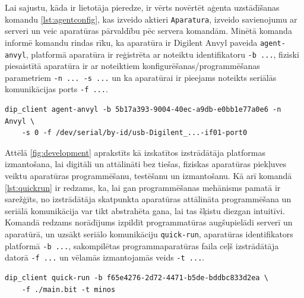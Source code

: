 Lai sajustu, kāda ir lietotāja pieredze, ir vērts novērtēt aģenta uzstādīšanas
komandu \ref{lst:agentconfig}, kas izveido aktieri \lstinline!Aparatura!,
izveido savienojumu ar serveri un veic aparatūras pārvaldību pēc servera
komandām. Minētā komanda informē komandu rindas rīku, ka aparatūra ir Digilent
Anvyl paveida \lstinline!agent-anvyl!, platformā aparatūra ir reģistrēta ar noteiktu
identifikatoru \lstinline!-b ...!, fiziski piesaistītā aparatūra ir ar noteiktiem
konfigurēšanas/programmēšanas parametriem \lstinline!-n ... -s ...! un ka aparatūrai ir
pieejams noteikts seriālās komunikācijas ports \lstinline!-f ...!.

\begin{lstlisting}[caption={Aģenta uzstādīšana komandu rindā},label={lst:agentconfig},captionpos=b]
dip_client agent-anvyl -b 5b17a393-9004-40ec-a9db-e0bb1e77a0e6 -n Anvyl \
    -s 0 -f /dev/serial/by-id/usb-Digilent_...-if01-port0
\end{lstlisting}

Attēlā \ref{fig:development} aprakstīts kā izskatītos izstrādātāja platformas
izmantošana, lai digitāli un attālināti bez tiešas, fiziskas aparatūras
piekļuves veiktu aparatūras programmēšanu, testēšanu un izmantošanu. Kā arī
komandā \ref{lst:quickrun} ir redzams, ka, lai gan programmēšanas mehānisms
pamatā ir sarežģīts, no izstrādātāja skatpunkta aparatūras attālināta
programmēšana un seriālā komunikācija var tikt abstrahēta gana, lai tas šķistu
diezgan intuitīvi. Komandā redzams norādījums izpildīt programmatūras
augšupielādi serverī un aparatūrā, un uzsākt seriālo komunikāciju
\lstinline!quick-run!, aparatūras identifikators platformā \lstinline!-b ...!,
sakompilētas programmaparatūras faila ceļš izstrādātāja datorā \lstinline!-f ...!
un vēlamās izmantojamās \glslink{vinterface}{virtuālās saskarnes} veids
\lstinline!-t ...!.

\begin{lstlisting}[caption={Programmaparatūras augšupielāde un seriālās komunikācijas klienta komanda},label={lst:quickrun},captionpos=b]
dip_client quick-run -b f65e4276-2d72-4471-b5de-bddbc833d2ea \ 
    -f ./main.bit -t minos
\end{lstlisting}

